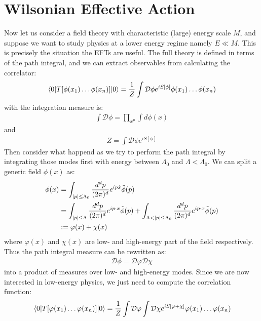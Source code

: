 \section{Wilsonian Effective Action}
Now let us consider a field theory with characteristic (large) energy scale $M$, and suppose we want to study physics at a lower energy regime namely $E \ll M$. This is precisely the situation the EFTs are useful. The full theory is defined in terms of the path integral, and we can extract observables from calculating the correlator:
\begin{align}
    \mel{0}{T[\phi(x_{1}) \dotso \phi(x_{n})]}{0} = \frac{1}{Z}\int \mathcal{D} \phi e^{iS[\phi]} \phi(x_{1}) \dots \phi(x_{n})
\end{align}
with the integration measure is:
\begin{align}
    \int \mathcal{D}\phi = \prod_{x^{\mu}} \int d\phi(x)
\end{align}
and
\begin{align}
    Z = \int \mathcal{D}\phi e^{iS[\phi]}
\end{align}
Then consider what happend as we try to perform the path integral by integrating those modes first with energy between $\Lambda _{0}$ and $\Lambda < \Lambda_{0}$. We can split a generic field $\phi(x)$ as:
\begin{align}
    \begin{split}
        \phi(x) &= \int _{\abs{p} \le \Lambda_{0}} \frac{d^{d}p}{(2\pi)^{d}} e^{ip\dot x} \tilde{\phi}(p) \\
        &= \int _{\abs{p} \le \Lambda} \frac{d^{d}p}{(2\pi)^{d}} e^{ip\cdot x} \tilde{\phi}(p) + \int _{\Lambda < \abs{p} \le \Lambda _{0}} \frac{d^{d}p}{(2\pi)^{d}} e^{ip\cdot x} \tilde{\phi}(p) \\
        & := \varphi (x) + \chi (x)
    \end{split}
\end{align}
where $\varphi(x)$ and $\chi(x)$ are low- and high-energy part of the field respectively. Thus the path integral measure can be rewritten as:
\begin{align}
    \mathcal{D}\phi = \mathcal{D} \varphi \mathcal{D} \chi
\end{align}
into a product of measures over low- and high-energy modes. Since we are now interested in low-energy physics, we just need to compute the correlation function:
\begin{align}
    \mel{0}{T[\varphi(x_{1}) \dotso \varphi(x_{n})]}{0} = \frac{1}{Z} \int \mathcal{D} \varphi \int \mathcal{D} \chi e^{iS[\varphi + \chi]} \varphi(x_{1}) \dotso \varphi(x_{n})
\end{align}

